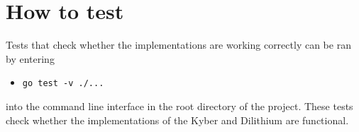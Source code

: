 \section{How to test}
Tests that check whether the implementations are working correctly can be ran by entering
\begin{itemize}
  \item \texttt{go test -v ./...}
\end{itemize}
into the command line interface in the root directory of the project. These tests check whether the implementations of the Kyber and Dilithium are functional.

